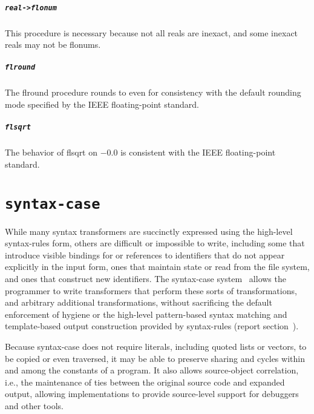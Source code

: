\documentclass[twoside,twocolumn]{algol60}
\begin{document}
\paragraph{{\tt real->flonum}}

This procedure is necessary because not all reals are inexact, and
some inexact reals may not be flonums.

\paragraph{{\tt flround}}

The {\cf flround} procedure rounds to even for consistency with the default rounding
mode specified by the IEEE floating-point standard.

\paragraph{{\tt flsqrt}}

The behavior of {\cf flsqrt} on $-0.0$ is consistent with the IEEE
floating-point standard.


\chapter{{\tt syntax-case}}

While many syntax transformers are succinctly expressed using the
high-level {\cf syntax-rules} form, others are difficult or impossible
to write, including some that introduce visible bindings for or references
to identifiers that do not appear explicitly in the input form, ones that
maintain state or read from the file system, and ones that construct new
identifiers.
The {\cf syntax-case} system~\cite{syntacticabstraction} 
allows the programmer to write transformers that perform these sorts of
transformations, and arbitrary additional transformations, without
sacrificing the default enforcement of hygiene or the high-level
pattern-based syntax matching and template-based output construction
provided by {\cf syntax-rules} (report
section~).

Because {\cf syntax-case} does not require literals, including quoted
lists or vectors, to be copied or even traversed, it may be able to preserve sharing
and cycles within and among the constants of a program.  It also
allows source-object correlation, i.e., the maintenance of ties
between the original source code and expanded output, allowing
implementations to provide source-level support for debuggers and
other tools.
\end{document}
